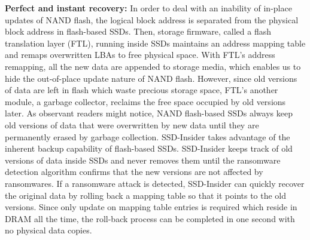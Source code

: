 \documentclass[conference]{IEEEtran}
\newcommand{\ours}{SSD-Insider}
\begin{document}
{\noindent\bf Perfect and instant recovery:}
In order to deal with an inability of in-place updates of NAND flash, the logical block
address is separated from the physical block address in flash-based SSDs.
Then, storage firmware, called a flash translation layer (FTL), running inside SSDs
maintains an address mapping table and remaps overwritten LBAs to free physical
space.  With FTL's address remapping, all the new data are appended to storage
media, which  enables us to hide the out-of-place update nature of NAND flash.
However, since old versions of data are left in flash which waste precious
storage space, FTL's another module, a garbage collector, reclaims the free
space occupied by old versions later.  As observant readers might notice, NAND
flash-based SSDs always keep old versions of data that were overwritten by new
data until they are permanently erased by garbage collection. \ours{} takes
advantage of the inherent backup capability of flash-based SSDs. \ours{} keeps
track of old versions of data inside SSDs and never removes them until the
ransomware detection algorithm confirms that the new versions are not affected
by ransomwares. If a ransomware attack is detected, \ours{} can quickly recover
the original data by rolling back a mapping table so that it points to the old
versions.  Since only update on mapping table entries is required which
reside in DRAM all the time, the roll-back process can be completed in one
second with no physical data copies.
\end{document}
